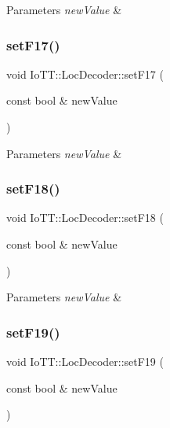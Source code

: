 \begin{DoxyParams}{Parameters}
{\em new\+Value} & \\
\hline
\end{DoxyParams}
\mbox{\label{classIoTT_1_1LocDecoder_a8e10e113460d9c377234cd1be678931a}} 
\subsubsection{\texorpdfstring{set\+F17()}{setF17()}}
{\footnotesize\ttfamily void Io\+T\+T\+::\+Loc\+Decoder\+::set\+F17 (\begin{DoxyParamCaption}\item[{const bool \&}]{new\+Value }\end{DoxyParamCaption})}


\begin{DoxyParams}{Parameters}
{\em new\+Value} & \\
\hline
\end{DoxyParams}
\mbox{\label{classIoTT_1_1LocDecoder_aeb2fef072ba2340f98b72b6a4d65af6a}} 
\subsubsection{\texorpdfstring{set\+F18()}{setF18()}}
{\footnotesize\ttfamily void Io\+T\+T\+::\+Loc\+Decoder\+::set\+F18 (\begin{DoxyParamCaption}\item[{const bool \&}]{new\+Value }\end{DoxyParamCaption})}


\begin{DoxyParams}{Parameters}
{\em new\+Value} & \\
\hline
\end{DoxyParams}
\mbox{\label{classIoTT_1_1LocDecoder_a5b39b25fbce7cb68a89862e34d0829ee}} 
\subsubsection{\texorpdfstring{set\+F19()}{setF19()}}
{\footnotesize\ttfamily void Io\+T\+T\+::\+Loc\+Decoder\+::set\+F19 (\begin{DoxyParamCaption}\item[{const bool \&}]{new\+Value }\end{DoxyParamCaption})}


